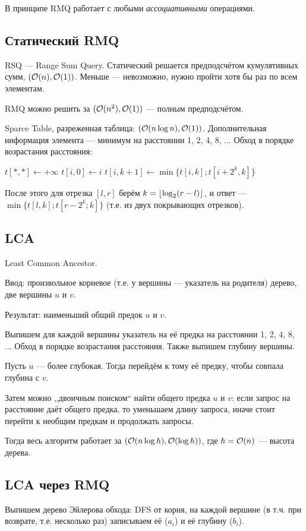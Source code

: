 В принципе RMQ работает с любыми \emph{ассоциативными} операциями.

\subsection{Статический RMQ}
RSQ --- Range Sum Query.
Статический решается предподсчётом кумулятивных сумм, $(\mathcal{O}(n), \mathcal{O}(1))$.
Меньше --- невозможно, нужно пройти хотя бы раз по всем элементам.

RMQ можно решить за $(\mathcal{O}(n^2), \mathcal{O}(1))$ --- полным предподсчётом.

Sparce Table, разреженная таблица: $(\mathcal{O}(n \log n), \mathcal{O}(1))$.
Дополнительная информация элемента --- минимум на расстоянии 1, 2, 4, 8, ...
Обход в порядке возрастания расстояния:
\begin{algorithmic}
    \State $t[*, *] \gets +\infty$
        \State $t[i, 0] \gets i$
    \EndFor
            \State $t[i, k + 1] \gets \min\{t[i, k]; t[i + 2^k, k]\}$
        \EndFor
    \EndFor
\end{algorithmic}
После этого для отрезка $[l, r]$ берём $k = \left \lfloor \log_2(r - l) \right \rfloor$,
и ответ --- $\min\{t[l, k]; t[r - 2^k; k]\}$ (т.е. из двух покрывающих отрезков).

\subsection{LCA}
Least Common Ancestor.

Ввод:
произвольное корневое (т.е. у вершины --- указатель на родителя) дерево,
две вершины $u$ и $v$.

Результат:
наименьший общий предок $u$ и $v$.

Выпишем для каждой вершины указатель на её предка на расстоянии 1, 2, 4, 8, ...
Обход в порядке возрастания расстояния.
Также выпишем глубину вершины.

Пусть $u$ --- более глубокая.
Тогда перейдём к тому её предку, чтобы совпала глубина с $v$.

Затем можно ,,двоичным поиском`` найти общего предка $u$ и $v$:
если запрос на расстояние даёт общего предка,
то уменьшаем длину запроса,
иначе стоит перейти к необщим предкам и продолжать запросы.

Тогда весь алгоритм работает за $(\mathcal{O}(n \log h), \mathcal{O}(\log h))$,
где $h = \mathcal{O}(n)$ --- высота дерева.

\subsection{LCA через RMQ}
Выпишем дерево Эйлерова обхода:
DFS от корня, на каждой вершине
(в т.ч. при возврате, т.е. несколько раз)
записываем её ($a_i$) и её глубину ($b_i$).

